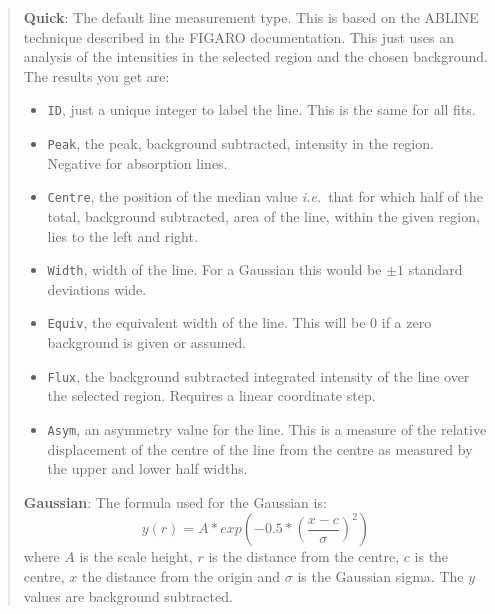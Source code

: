 \documentclass[twoside,11pt]{article}
\newcommand{\xref}[3]{#1}
\renewcommand{\_}{\texttt{\symbol{95}}}
\newcommand{\labelitem}[1]{\textbf{#1}}
\newcommand{\hitext}[1]{\texttt{#1}}
\newcommand{\ie}{\textit{i.e.}}
\begin{document}
\begin{quote}
 \labelitem{Quick}: The default line measurement type. This is based on
 the ABLINE technique described in the \xref{FIGARO}{sun86}{}
 documentation. This just uses an analysis of the intensities in the
 selected region and the chosen background. The results you get are:
 \begin{itemize}
   \item \hitext{ID}, just a unique integer to label the line. This is
         the same for all fits.
   \item \hitext{Peak}, the peak, background subtracted, intensity in
         the region. Negative for absorption lines.
   \item \hitext{Centre}, the position of the median value \ie\ that
         for which half of the total, background subtracted, area of
         the line, within the given region, lies to the left and right.
   \item \hitext{Width}, width of the line. For a Gaussian this would
         be $\pm 1$ standard deviations wide.
   \item \hitext{Equiv}, the equivalent width of the line. This will be
         $0$ if a zero background is given or assumed.
   \item \hitext{Flux}, the background subtracted integrated intensity
         of the line over the selected region. Requires a linear
         coordinate step.
   \item \hitext{Asym}, an asymmetry value for the line. This is a
         measure of the relative displacement of the centre of the
         line from the centre as measured by the upper and lower
         half widths.
 \end{itemize}

 \labelitem{Gaussian}: The formula used for the Gaussian is:
 \[
  y(r) = A * exp\left( -0.5 * \left(\frac{x-c}{\sigma}\right)^{2}\right)
 \]
 where $A$ is the scale height, $r$ is the distance from the centre,
 $c$ is the centre, $x$ the distance from the origin and $\sigma$ is
 the Gaussian sigma. The $y$ values are background subtracted.


\end{quote}
\end{document}
